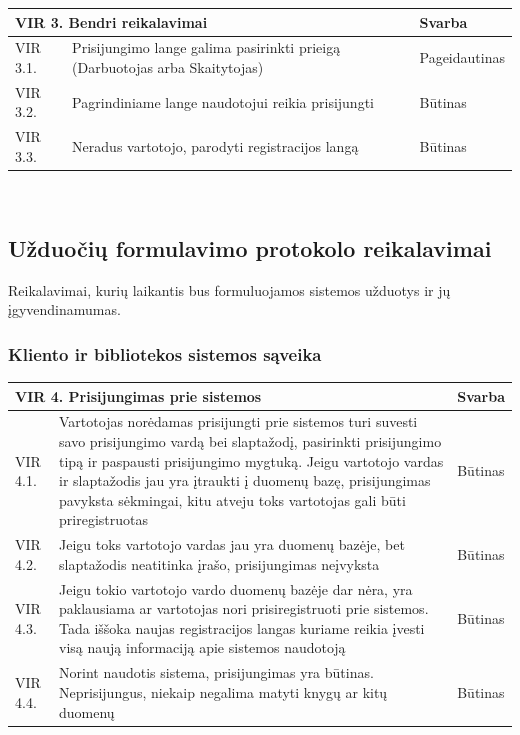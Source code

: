 \documentclass{VUMIFPSkursinis}
\begin{document}
    \noindent    
\vspace{5mm}
    \begin{tabular}{ | p{} | p{} | p{} |}
    		\hline
   		\multicolumn{2}{|l|}{     VIR 3. Bendri reikalavimai} &Svarba  \\ \hline 
		  	VIR 3.1. & Prisijungimo lange galima pasirinkti prieigą (Darbuotojas arba Skaitytojas) & Pageidautinas \\ \hline
            VIR 3.2. & Pagrindiniame lange naudotojui reikia prisijungti & Būtinas \\ \hline
            VIR 3.3. & Neradus vartotojo, parodyti registracijos langą & Būtinas \\ \hline
   	\end{tabular}\\
    
\subsection{Užduočių formulavimo protokolo reikalavimai}
Reikalavimai, kurių laikantis bus formuluojamos sistemos užduotys ir jų įgyvendinamumas.
\subsubsection{Kliento ir bibliotekos sistemos sąveika}

	\noindent
\vspace{5mm}
    \begin{tabular}{ | p{} | p{} | p{} |}
    		\hline
   			\multicolumn{2}{|l|}{ VIR 4. Prisijungimas prie sistemos} &Svarba  \\ \hline 
		  	VIR 4.1. & Vartotojas norėdamas prisijungti prie sistemos turi suvesti savo prisijungimo vardą bei slaptažodį, pasirinkti prisijungimo tipą ir paspausti prisijungimo 		mygtuką. Jeigu vartotojo vardas ir slaptažodis jau yra įtraukti į duomenų bazę, prisijungimas pavyksta sėkmingai, kitu atveju toks vartotojas gali būti priregistruotas & Būtinas \\ \hline
            VIR 4.2. & Jeigu toks vartotojo vardas jau yra duomenų bazėje, bet slaptažodis neatitinka įrašo, prisijungimas neįvyksta & Būtinas \\ \hline
            VIR 4.3. & Jeigu tokio vartotojo vardo duomenų bazėje dar nėra, yra paklausiama ar vartotojas nori prisiregistruoti prie sistemos. Tada iššoka naujas registracijos langas kuriame reikia įvesti visą naują informaciją apie sistemos naudotoją & Būtinas \\ \hline
            VIR 4.4. & Norint naudotis sistema, prisijungimas yra būtinas. Neprisijungus, niekaip negalima matyti knygų ar kitų duomenų & Būtinas \\ \hline
   	\end{tabular}\\
    
\end{document}
